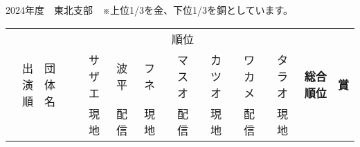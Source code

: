 \documentclass[11pt,a4paper,landscape,twoside,openany,english,uplatex]{jsarticle}
\begin{document}
2024年度　東北支部　※上位1/3を金、下位1/3を銅としています。
\begin{table}[h]
 \centering
 \begin{tabular}{r|l|rrrrrrr|r|c}
  \hline
  \multirow{3}{*}{出演順} & \multirow{3}{*}{団体名} & \multicolumn{7}{|c|}{順位} & \multirow{3}{*}{\textbf{総合順位}} &  \multirow{3}{*}{\textbf{賞}} \\
  \cline{3-9} %
    &  & サザエ & 波平 & フネ & マスオ &  カツオ & ワカメ & タラオ &  &  \\
    &  & 現地   & 配信 & 現地 & 配信   &  現地   & 配信   & 現地   &  &  \\
  \hline \hline

\end{tabular}
\end{table}
\end{document}
